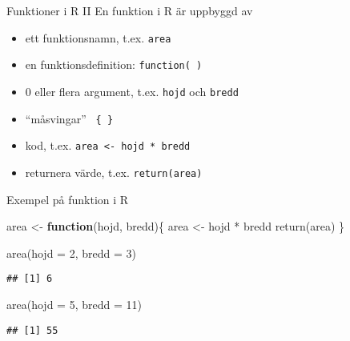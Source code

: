 \documentclass[
  10pt,
  ignorenonframetext,
]{beamer}
\newenvironment{Shaded}{\begin{snugshade}}{\end{snugshade}}
\newcommand{\AttributeTok}[1]{\textcolor[rgb]{0.77,0.63,0.00}{#1}}
\newcommand{\ControlFlowTok}[1]{\textcolor[rgb]{0.13,0.29,0.53}{\textbf{#1}}}
\newcommand{\DecValTok}[1]{\textcolor[rgb]{0.00,0.00,0.81}{#1}}
\newcommand{\FunctionTok}[1]{\textcolor[rgb]{0.00,0.00,0.00}{#1}}
\newcommand{\NormalTok}[1]{#1}
\newcommand{\OtherTok}[1]{\textcolor[rgb]{0.56,0.35,0.01}{#1}}
\newcommand{\SpecialCharTok}[1]{\textcolor[rgb]{0.00,0.00,0.00}{#1}}
\providecommand{\tightlist}{%
  \setlength{\itemsep}{0pt}\setlength{\parskip}{0pt}}
\begin{document}
\begin{frame}{Funktioner i R II}
\protect\hypertarget{funktioner-i-r-ii}{}
En funktion i R är uppbyggd av

\begin{itemize}
\tightlist
\item
  ett funktionsnamn, t.ex. \texttt{area}
\item
  en funktionsdefinition: \texttt{function( )}
\item
  0 eller flera argument, t.ex. \texttt{hojd} och \texttt{bredd}
\item
  ``måsvingar'' \texttt{ \{ \} }
\item
  kod, t.ex. \texttt{area <- hojd * bredd}
\item
  returnera värde, t.ex. \texttt{return(area)}
\end{itemize}
\end{frame}

\begin{frame}[fragile]{Exempel på funktion i R}
\protect\hypertarget{exempel-puxe5-funktion-i-r}{}
\begin{Shaded}
\begin{Highlighting}[]
\NormalTok{area }\OtherTok{\textless{}{-}} \ControlFlowTok{function}\NormalTok{(hojd, bredd)\{}
\NormalTok{  area }\OtherTok{\textless{}{-}}\NormalTok{ hojd }\SpecialCharTok{*}\NormalTok{ bredd}
  \FunctionTok{return}\NormalTok{(area)}
\NormalTok{\}}
\end{Highlighting}
\end{Shaded}

\begin{Shaded}
\begin{Highlighting}[]
\FunctionTok{area}\NormalTok{(}\AttributeTok{hojd =} \DecValTok{2}\NormalTok{, }\AttributeTok{bredd =} \DecValTok{3}\NormalTok{)}
\end{Highlighting}
\end{Shaded}

\begin{verbatim}
## [1] 6
\end{verbatim}

\begin{Shaded}
\begin{Highlighting}[]
\FunctionTok{area}\NormalTok{(}\AttributeTok{hojd =} \DecValTok{5}\NormalTok{, }\AttributeTok{bredd =} \DecValTok{11}\NormalTok{)}
\end{Highlighting}
\end{Shaded}

\begin{verbatim}
## [1] 55
\end{verbatim}
\end{frame}
\end{document}
